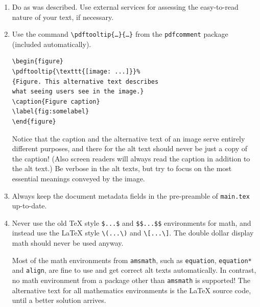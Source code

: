 \begin{enumerate}
\item Do as was described. Use external services for assessing the easy-to-read nature of your text, if necessary.
\item Use the command \texttt{\textbackslash pdftooltip\{\ldots\}\{\ldots\}} from the \texttt{pdfcomment} package (included automatically).
\begin{verbatim}
\begin{figure}
\pdftooltip{\texttt{[image: ...]}}%
{Figure. This alternative text describes
what seeing users see in the image.}
\caption{Figure caption}
\label{fig:somelabel}
\end{figure}
\end{verbatim}
Notice that the caption and the alternative text of an image serve entirely different purposes, and there for the alt text should never be just a copy of the caption! (Also screen readers will always read the caption in addition to the alt text.) Be verbose in the alt texts, but try to focus on the most essential meanings conveyed by the image.
\item Always keep the document metadata fields in the pre-preamble of \texttt{main.tex} up-to-date.
\item Never use the old \TeX{} style \verb+$...$+ and \verb+$$...$$+ environments for math, and instead use the \LaTeX{} style \verb+\(...\)+ and \verb+\[...\]+. The double dollar display math should never be used anyway.

Most of the math environments from \texttt{amsmath}, such as \texttt{equation}, \texttt{equation*} and \texttt{align}, are fine to use and get correct alt texts automatically. In contrast, no math environment from a package other than \texttt{amsmath} is supported! The alternative text for all mathematics environments is the \LaTeX{} source code, until a better solution arrives.
\end{enumerate}
